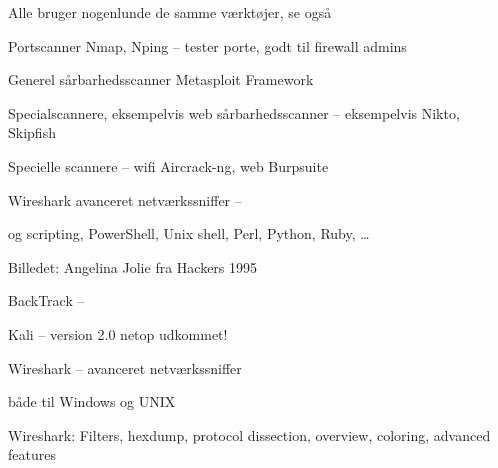 \documentclass[20pt,landscape,a4paper,footrule]{foils}
\begin{document}

\begin{list2}
\item Alle bruger nogenlunde de samme værktøjer, se også 
\item Portscanner Nmap, Nping -- tester porte, godt til firewall admins 
\item Generel sårbarhedsscanner Metasploit Framework 
\item Specialscannere, eksempelvis web sårbarhedsscanner -- eksempelvis Nikto, Skipfish
\item Specielle scannere -- wifi Aircrack-ng, web Burpsuite 
\item Wireshark avanceret netværkssniffer -- 
\item og scripting, PowerShell, Unix shell, Perl, Python, Ruby, \ldots
\end{list2}

Billedet: Angelina Jolie fra Hackers 1995





\begin{list1}
\item BackTrack -- 
\item Kali --  version 2.0 netop udkommet!
\item Wireshark --  avanceret netværkssniffer
\end{list1}








\centerline{}
\vskip 5mm
\centerline{både til Windows og UNIX}


Wireshark: Filters, hexdump, protocol dissection, overview, coloring, advanced features
\end{document}
